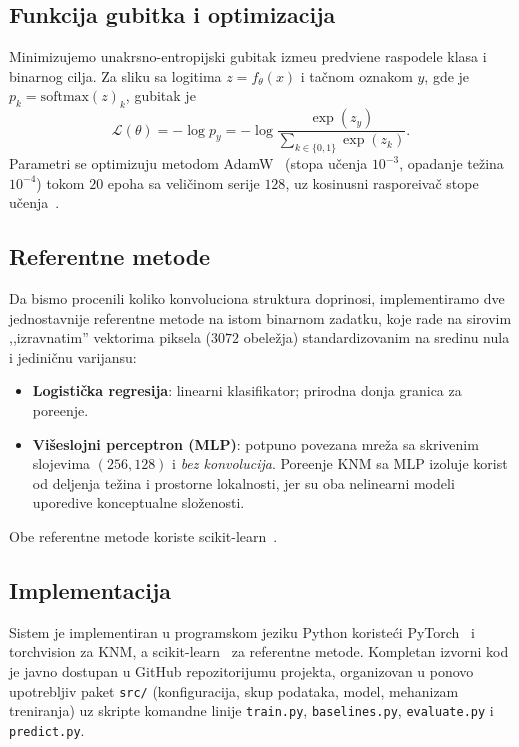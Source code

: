 \documentclass[11pt,a4paper]{article}
\begin{document}
\subsection{Funkcija gubitka i optimizacija}
Minimizujemo unakrsno-entropijski gubitak izme\dj u predvi\dj ene raspodele
klasa i binarnog cilja. Za sliku sa logitima $z = f_\theta(x)$ i ta\v cnom
oznakom $y$, gde je $p_k = \mathrm{softmax}(z)_k$, gubitak je
\begin{equation}
\mathcal{L}(\theta) = -\log p_y
   = -\log \frac{\exp(z_y)}{\sum_{k\in\{0,1\}} \exp(z_k)}.
\end{equation}
Parametri se optimizuju metodom AdamW~\cite{kingma2015adam,loshchilov2019decoupled}
(stopa u\v cenja $10^{-3}$, opadanje te\v zina $10^{-4}$) tokom $20$ epoha sa
veli\v cinom serije $128$, uz kosinusni raspore\dj iva\v c stope
u\v cenja~\cite{loshchilov2017sgdr}.

\subsection{Referentne metode}
Da bismo procenili koliko konvoluciona struktura doprinosi, implementiramo dve
jednostavnije referentne metode na istom binarnom zadatku, koje rade na sirovim
,,izravnatim'' vektorima piksela ($3072$ obele\v zja) standardizovanim na
sredinu nula i jedini\v cnu varijansu:
\begin{itemize}
  \item \textbf{Logisti\v cka regresija}: linearni klasifikator; prirodna
        donja granica za pore\dj enje.
  \item \textbf{Vi\v seslojni perceptron (MLP)}: potpuno povezana mre\v za sa
        skrivenim slojevima $(256, 128)$ i \emph{bez konvolucija}. Pore\dj enje
        KNM sa MLP izoluje korist od deljenja te\v zina i prostorne lokalnosti,
        jer su oba nelinearni modeli uporedive konceptualne slo\v zenosti.
\end{itemize}
Obe referentne metode koriste scikit-learn~\cite{pedregosa2011scikit}.

\subsection{Implementacija}
Sistem je implementiran u programskom jeziku Python koriste\'ci
PyTorch~\cite{paszke2019pytorch} i torchvision za KNM, a
scikit-learn~\cite{pedregosa2011scikit} za referentne metode. Kompletan izvorni
kod je javno dostupan u GitHub repozitorijumu projekta, organizovan u
ponovo upotrebljiv paket \texttt{src/} (konfiguracija, skup podataka, model,
mehanizam treniranja) uz skripte komandne linije \texttt{train.py},
\texttt{baselines.py}, \texttt{evaluate.py} i \texttt{predict.py}.
\end{document}
